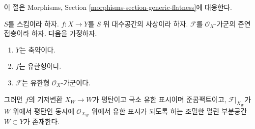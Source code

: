 \noindent
이 절은 Morphisms, Section
\ref{morphisms-section-generic-flatness}에 대응한다.

\begin{proposition}
\label{proposition-generic-flatness-reduced}
$S$를 스킴이라 하자.
$f : X \to Y$를 $S$ 위 대수공간의 사상이라 하자.
$\mathcal{F}$를 $\mathcal{O}_X$-가군의 준연접층이라 하자.
다음을 가정하자.
\begin{enumerate}
\item $Y$는 축약이다.
\item $f$는 유한형이다.
\item $\mathcal{F}$는 유한형 $\mathcal{O}_X$-가군이다.
\end{enumerate}
그러면 $f$의 기저변환 $X_W \to W$가 평탄이고 국소 유한 표시이며
준콤팩트이고, $\mathcal{F}|_{X_W}$가 $W$ 위에서 평탄인 동시에
$\mathcal{O}_{X_W}$ 위에서 유한 표시가 되도록 하는 조밀한 열린
부분공간 $W \subset Y$가 존재한다.
\end{proposition}

